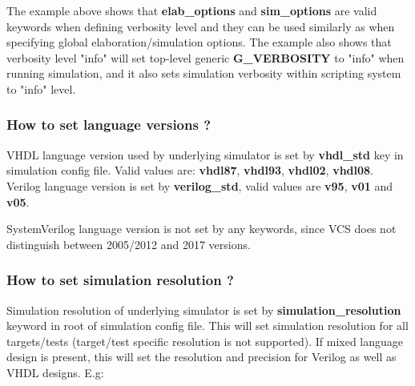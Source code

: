 \documentclass{tropic_design_spec}
\begin{document}
The example above shows that \textbf{elab_options} and \textbf{sim_options} are valid
keywords when defining verbosity level and they can be used similarly as
when specifying global elaboration/simulation options.
The example also shows that verbosity level "info" will set top-level generic
\textbf{G_VERBOSITY} to "info" when running simulation, and it also sets simulation
verbosity within scripting system to "info" level.



\subsubsection{How to set language versions ?}
\label{sec:how-to-set-language-versions}

VHDL language version used by underlying simulator is set by \textbf{vhdl_std} key
in simulation config file. Valid values are: \textbf{vhdl87}, \textbf{vhdl93},
\textbf{vhdl02}, \textbf{vhdl08}. Verilog language version is set by \textbf{verilog_std},
valid values are \textbf{v95}, \textbf{v01} and \textbf{v05}.

SystemVerilog language version is not set by any keywords, since VCS does not distinguish
between 2005/2012 and 2017 versions.


\subsubsection{How to set simulation resolution ?}
\label{sec:how-to-set-simulation-resolution}

Simulation resolution of underlying simulator is set by \textbf{simulation_resolution}
keyword in root of simulation config file. This will set simulation resolution for all
targets/tests (target/test specific resolution is not supported). If mixed language
design is present, this will set the resolution and precision for Verilog as well as
VHDL designs. E.g:
\end{document}
